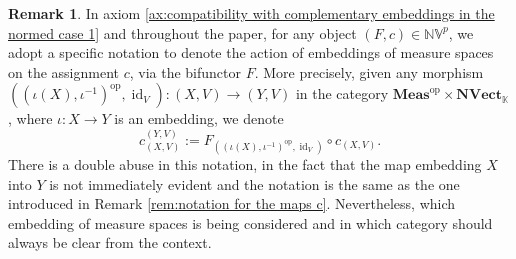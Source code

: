 \documentclass{amsart}
\theoremstyle{definition}
\newtheorem{remark}[definition]{Remark}
\theoremstyle{plain}
\newcommand{\id}{\operatorname{id}}
\newcommand{\opMeas}{\mathbf{Meas}^\mathrm{op}}
\newcommand{\NVect}{\mathbf{NVect}_{\mathbb{K}}}
\newcommand{\NVp}{\mathbb{NV}^p}
\begin{document}
        \begin{remark}
        \label{rem:notation for the maps c 1}
            In axiom \ref{ax:compatibility with complementary embeddings in the normed case 1} and throughout the paper, for any object $(F,c) \in \NVp$, we adopt a specific notation to denote the action of embeddings of measure spaces on the assignment $c$, via the bifunctor $F$.
            More precisely, given any morphism $\left( \left( \iota(X),\iota^{-1} \right)^{\mathrm{op}},\id_V \right) \colon (X,V) \rightarrow (Y,V)$ in the category $\opMeas \times \NVect$, where $\iota \colon X \rightarrow Y$ is an embedding, we denote
            \begin{equation*}
                c_{(X,V)}^{(Y,V)} := F_{\left( \left( \iota(X),\iota^{-1} \right)^{\mathrm{op}},\id_V \right)} \circ c_{(X,V)}.
            \end{equation*}
            There is a double abuse in this notation, in the fact that the map embedding $X$ into $Y$ is not immediately evident and the notation is the same as the one introduced in Remark \ref{rem:notation for the maps c}.
            Nevertheless, which embedding of measure spaces is being considered and in which category should always be clear from the context.
        \end{remark}
        
\end{document}
